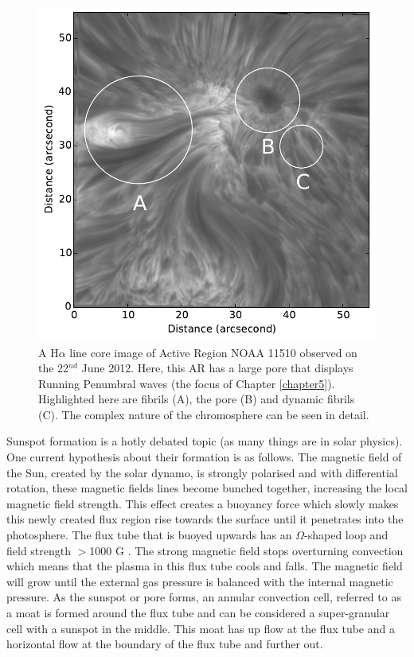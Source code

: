     \begin{figure}
    	\centering
    	\includegraphics[width=\textwidth]{Chromo.pdf}
    	\caption{
    		A H$\alpha$ line core image of Active Region NOAA 11510 observed on the 22$^{{nd}}$ June 2012.
    		Here, this AR has a large pore that displays Running Penumbral waves (the focus of Chapter \ref{chapter5}).
    		Highlighted here are fibrils (A), the pore (B) and dynamic fibrils (C).
    		The complex nature of the chromosphere can be seen in detail.
    	}
    	\label{fig:chromosphere}
    \end{figure}   
    	
    Sunspot formation is a hotly debated topic (as many things are in solar physics).
    One current hypothesis about their formation is as follows.
    The magnetic field of the Sun, created by the solar dynamo, is strongly polarised and with differential rotation, these magnetic fields lines become bunched together, increasing the local magnetic field strength.
    This effect creates a buoyancy force which slowly makes this newly created flux region rise towards the surface until it penetrates into the photosphere.
    The flux tube that is buoyed upwards has an $\Omega$-shaped loop and field strength $>$1000 G \citep{stix2004sun,2014SoPh..289.3351T}.
    The strong magnetic field stops overturning convection which means that the plasma in this flux tube cools and falls. 
    The magnetic field will grow until the external gas pressure is balanced with the internal magnetic pressure.
    As the sunspot or pore forms, an annular convection cell, referred to as a moat is formed around the flux tube and can be considered a super-granular cell with a sunspot in the middle.
    This moat has up flow at the flux tube and a horizontal flow at the boundary of the flux tube and further out.
    
